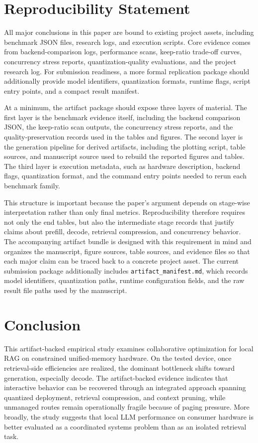 \documentclass[10pt,twocolumn]{article}
\begin{document}
\section{Reproducibility Statement}

All major conclusions in this paper are bound to existing project assets, including benchmark JSON files, research logs, and execution scripts. Core evidence comes from backend-comparison logs, performance scans, keep-ratio trade-off curves, concurrency stress reports, quantization-quality evaluations, and the project research log. For submission readiness, a more formal replication package should additionally provide model identifiers, quantization formats, runtime flags, script entry points, and a compact result manifest.

At a minimum, the artifact package should expose three layers of material. The first layer is the benchmark evidence itself, including the backend comparison JSON, the keep-ratio scan outputs, the concurrency stress reports, and the quality-preservation records used in the tables and figures. The second layer is the generation pipeline for derived artifacts, including the plotting script, table sources, and manuscript source used to rebuild the reported figures and tables. The third layer is execution metadata, such as hardware description, backend flags, quantization format, and the command entry points needed to rerun each benchmark family.

This structure is important because the paper's argument depends on stage-wise interpretation rather than only final metrics. Reproducibility therefore requires not only the end tables, but also the intermediate stage records that justify claims about prefill, decode, retrieval compression, and concurrency behavior. The accompanying artifact bundle is designed with this requirement in mind and organizes the manuscript, figure sources, table sources, and evidence files so that each major claim can be traced back to a concrete project asset. The current submission package additionally includes \texttt{artifact\_manifest.md}, which records model identifiers, quantization paths, runtime configuration fields, and the raw result file paths used by the manuscript.

\section{Conclusion}

This artifact-backed empirical study examines collaborative optimization for local RAG on constrained unified-memory hardware. On the tested device, once retrieval-side efficiencies are realized, the dominant bottleneck shifts toward generation, especially decode. The artifact-backed evidence indicates that interactive behavior can be recovered through an integrated approach spanning quantized deployment, retrieval compression, and context pruning, while unmanaged routes remain operationally fragile because of paging pressure. More broadly, the study suggests that local LLM performance on consumer hardware is better evaluated as a coordinated systems problem than as an isolated retrieval task.
\end{document}
